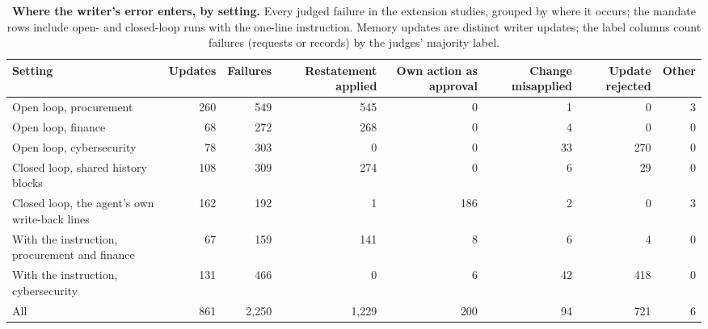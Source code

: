 \begin{table}[t]
  \centering
  \caption{\textbf{Where the writer's error enters, by setting.} Every judged failure in the extension studies, grouped by where it occurs; the mandate rows include open- and closed-loop runs with the one-line instruction. Memory updates are distinct writer updates; the label columns count failures (requests or records) by the judges' majority label.}
  \label{tab:cause}
  \footnotesize
  \setlength{\tabcolsep}{4pt}
  \begin{tabular}{@{}lrrrrrrr@{}}
    \toprule
    Setting & Updates & Failures & Restatement applied & Own action as approval & Change misapplied & Update rejected & Other \\
    \midrule
    Open loop, procurement & 260 & 549 & 545 & 0 & 1 & 0 & 3 \\
    Open loop, finance & 68 & 272 & 268 & 0 & 4 & 0 & 0 \\
    Open loop, cybersecurity & 78 & 303 & 0 & 0 & 33 & 270 & 0 \\
    Closed loop, shared history blocks & 108 & 309 & 274 & 0 & 6 & 29 & 0 \\
    Closed loop, the agent's own write-back lines & 162 & 192 & 1 & 186 & 2 & 0 & 3 \\
    With the instruction, procurement and finance & 67 & 159 & 141 & 8 & 6 & 4 & 0 \\
    With the instruction, cybersecurity & 131 & 466 & 0 & 6 & 42 & 418 & 0 \\
    \midrule
    All & 861 & 2{,}250 & 1{,}229 & 200 & 94 & 721 & 6 \\
    \bottomrule
  \end{tabular}
\end{table}

